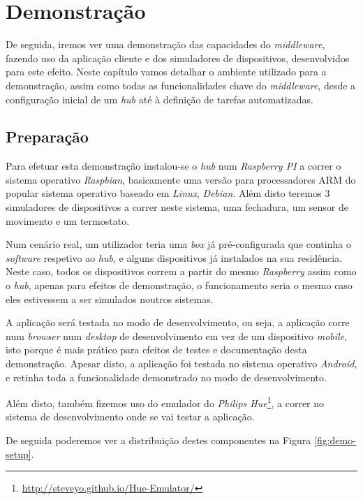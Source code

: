 \chapter{Demonstração}

De seguida, iremos ver uma demonstração das capacidades do \textit{middleware}, fazendo uso da aplicação cliente e dos simuladores de dispositivos, desenvolvidos para este efeito. Neste capítulo vamos detalhar o ambiente utilizado para a demonstração, assim como todas as funcionalidades chave do \textit{middleware}, desde a configuração inicial de um \textit{hub} até à definição de tarefas automatizadas.

\section{Preparação}

Para efetuar esta demonstração instalou-se o \textit{hub} num \textit{Raspberry PI} a correr o sistema operativo \textit{Raspbian}, basicamente uma versão para processadores ARM do popular sistema operativo baseado em \textit{Linux}, \textit{Debian}. Além disto teremos 3 simuladores de dispositivos a correr neste sistema, uma fechadura, um sensor de movimento e um termostato.

Num cenário real, um utilizador teria uma \textit{box} já pré-configurada que continha o \textit{software} respetivo ao \textit{hub}, e alguns dispositivos já instalados na sua residência. Neste caso, todos os dispositivos correm a partir do mesmo \textit{Raspberry} assim como o \textit{hub}, apenas para efeitos de demonstração, o funcionamento seria o mesmo caso eles estivessem a ser simulados noutros sistemas.

A aplicação será testada no modo de desenvolvimento, ou seja, a aplicação corre num \textit{browser} num \textit{desktop} de desenvolvimento em vez de um dispositivo \textit{mobile}, isto porque é mais prático para efeitos de testes e documentação desta demonstração. Apesar disto, a aplicação foi testada no sistema operativo \textit{Android}, e retinha toda a funcionalidade demonstrado no modo de desenvolvimento.

Além disto, também fizemos uso do emulador do \textit{Philips Hue}\footnote{\url{http://steveyo.github.io/Hue-Emulator/}}, a correr no sistema de desenvolvimento onde se vai testar a aplicação. 

De seguida poderemos ver a distribuição destes componentes na Figura \ref{fig:demo-setup}.

